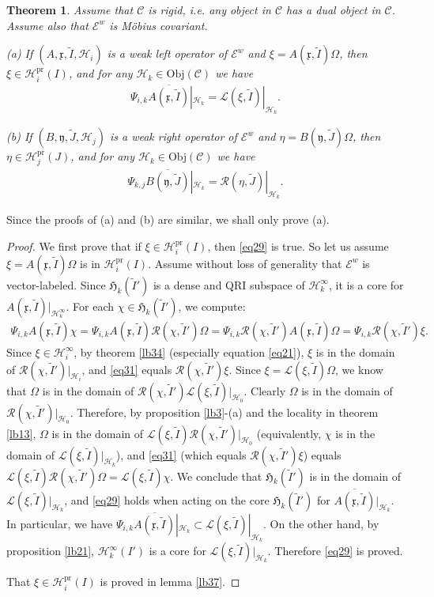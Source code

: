 \documentclass[12pt,a4paper]{article}
\theoremstyle{definition}
\theoremstyle{plain}
\newtheorem{thm}[df]{Theorem}
\newcommand{\fk}{\mathfrak}
\newcommand{\mc}{\mathcal}
\newcommand{\wtd}{\widetilde}
\newcommand{\ovl}{\overline}
\newcommand{\scr}{\mathscr}
\newcommand{\Obj}{\mathrm{Obj}}
\newcommand{\pr}{\mathrm{pr}}
\numberwithin{equation}{subsection}
\begin{document}
\begin{thm}\label{lb36}
Assume that $\scr C$ is rigid, i.e. any object in $\scr C$ has a dual object in $\scr C$. Assume also that $\scr E^w$ is M\"obius covariant. 

(a) If $(A,\fk x,\wtd I,\mc H_i)$ is a weak left operator of $\scr E^w$ and $\xi=A(\fk x,\wtd I)\Omega$, then $\xi\in\mc H_i^\pr(I)$, and for any $\mc H_k\in\Obj(\scr C)$ we have
\begin{align}
\Psi_{i,k}\ovl{A(\fk x,\wtd I)}|_{\mc H_k}=\scr L(\xi,\wtd I)|_{\mc H_k}.\label{eq29}
\end{align}

(b) If $(B,\fk y,\wtd J,\mc H_j)$ is a weak right operator of $\scr E^w$ and $\eta=B(\fk y,\wtd J)\Omega$, then $\eta\in\mc H_j^\pr(J)$, and for any $\mc H_k\in\Obj(\scr C)$ we have
\begin{align}
\Psi_{k,j}\ovl{B(\fk y,\wtd J)}|_{\mc H_k}=\scr R(\eta,\wtd J)|_{\mc H_k}.\label{eq30}
\end{align}
\end{thm}
Since the proofs of (a) and (b) are similar, we shall only prove (a).
\begin{proof}
We first prove that if $\xi\in\mc H_i^\pr(I)$, then \eqref{eq29} is true. So let us assume $\xi=A(\fk x,\wtd I)\Omega$ is in $\mc H_i^\pr(I)$. Assume without loss of generality that $\scr E^w$ is vector-labeled. Since $\fk H_k(\wtd I')$ is a dense and QRI subspace of  $\mc H_k^\infty$, it is a core for $A(\fk x,\wtd I)|_{\mc H_k^\infty}$. For each $\chi\in\fk H_k(\wtd I')$, we compute:
\begin{align}
\Psi_{i,k} A(\fk x,\wtd I)\chi=\Psi_{i,k} A(\fk x,\wtd I)\mc R(\chi,\wtd I')\Omega=\Psi_{i,k} \mc R(\chi,\wtd I')A(\fk x,\wtd I)\Omega=\Psi_{i,k} \mc R(\chi,\wtd I')\xi.\label{eq31}
\end{align}
Since $\xi\in\mc H_i^\infty$, by theorem \ref{lb34} (especially equation \eqref{eq21}), $\xi$ is in the domain of $\scr R(\chi,\wtd I')|_{\mc H_i}$, and \eqref{eq31} equals $\scr R(\chi,\wtd I')\xi$. Since $\xi=\scr L(\xi,\wtd I)\Omega$, we know that $\Omega$ is in the domain of $\scr R(\chi,\wtd I')\scr L(\xi,\wtd I)|_{\mc H_0}$. Clearly $\Omega$ is in the domain of $\scr R(\chi,\wtd I')|_{\mc H_0}$. Therefore, by proposition \ref{lb3}-(a) and the locality in theorem \ref{lb13}, $\Omega$ is in the domain of $\scr L(\xi,\wtd I)\scr R(\chi,\wtd I')|_{\mc H_0}$ (equivalently, $\chi$ is in the domain of $\scr L(\xi,\wtd I)|_{\mc H_k}$), and \eqref{eq31} (which equals $\scr R(\chi,\wtd I')\xi$) equals $\scr L(\xi,\wtd I)\scr R(\chi,\wtd I')\Omega=\scr L(\xi,\wtd I)\chi$. We conclude that $\fk H_k(\wtd I')$ is in the domain of $\scr L(\xi,\wtd I)|_{\mc H_k}$, and \eqref{eq29} holds when acting on the core $\fk H_k(\wtd I')$ for $\ovl{A(\fk x,\wtd I)}|_{\mc H_k}$. In particular, we have $\Psi_{i,k}\ovl{A(\fk x,\wtd I)}|_{\mc H_k}\subset\scr L(\xi,\wtd I)|_{\mc H_k}$. On the other hand, by proposition \ref{lb21}, $\mc H_k^\infty(I')$ is a core for $\scr L(\xi,\wtd I)|_{\mc H_k}$. Therefore \eqref{eq29} is proved.

That $\xi\in\mc H_i^\pr(I)$ is proved in lemma \ref{lb37}.
\end{proof}
\end{document}
